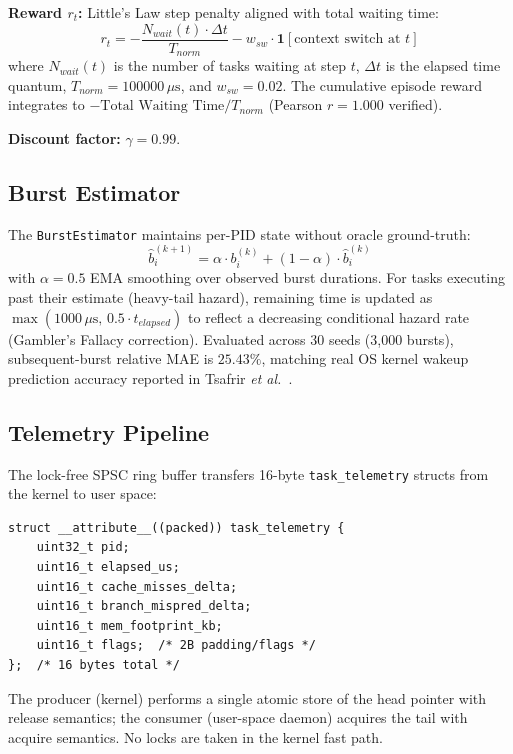 \smallskip
\noindent\textbf{Reward $r_t$:} Little's Law step penalty aligned with total waiting time:
\begin{equation}
  r_t = -\frac{N_{wait}(t) \cdot \Delta t}{T_{norm}} - w_{sw} \cdot
  \mathbf{1}[\text{context switch at } t]
  \label{eq:reward}
\end{equation}
where $N_{wait}(t)$ is the number of tasks waiting at step $t$,
$\Delta t$ is the elapsed time quantum, $T_{norm} = 100000\,\mu\text{s}$,
and $w_{sw} = 0.02$. The cumulative episode reward integrates to
$-\text{Total Waiting Time}/T_{norm}$ (Pearson $r = 1.000$ verified).

\smallskip
\noindent\textbf{Discount factor:} $\gamma = 0.99$.

\subsection{Burst Estimator}
\label{subsec:burst_est}

The \texttt{BurstEstimator} maintains per-PID state without oracle ground-truth:
\begin{equation}
  \hat{b}^{(k+1)}_i = \alpha \cdot b^{(k)}_i + (1-\alpha) \cdot \hat{b}^{(k)}_i
\end{equation}
with $\alpha = 0.5$ EMA smoothing over observed burst durations. For tasks
executing past their estimate (heavy-tail hazard), remaining time is updated as
$\max(1000\,\mu\text{s},\, 0.5 \cdot t_{elapsed})$ to reflect a
decreasing conditional hazard rate (Gambler's Fallacy correction). Evaluated
across 30 seeds (3{,}000 bursts), subsequent-burst relative MAE is $25.43\%$,
matching real OS kernel wakeup prediction accuracy reported in
Tsafrir \textit{et al.}~\cite{Tsafrir2007}.

\subsection{Telemetry Pipeline}
\label{subsec:telemetry}

The lock-free SPSC ring buffer transfers 16-byte \texttt{task\_telemetry}
structs from the kernel to user space:
\begin{footnotesize}
\begin{verbatim}
struct __attribute__((packed)) task_telemetry {
    uint32_t pid;
    uint16_t elapsed_us;
    uint16_t cache_misses_delta;
    uint16_t branch_mispred_delta;
    uint16_t mem_footprint_kb;
    uint16_t flags;  /* 2B padding/flags */
};  /* 16 bytes total */
\end{verbatim}
\end{footnotesize}
The producer (kernel) performs a single atomic store of the head pointer with
release semantics; the consumer (user-space daemon) acquires the tail with
acquire semantics. No locks are taken in the kernel fast path.

